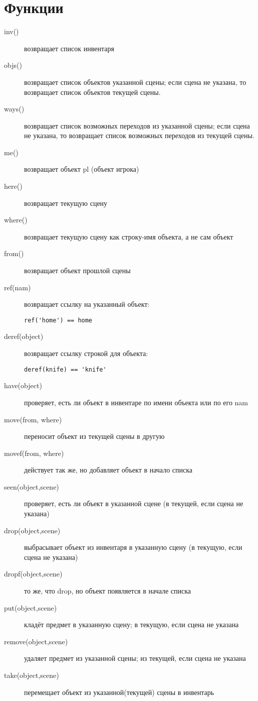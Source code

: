 \documentclass[a4paper,12pt]{article}
\begin{document}
\section{Функции}
\begin{description}
\item[inv()] возвращает список инвентаря
\item[objs()] возвращает список объектов указанной сцены; если сцена не указана, то возвращает список объектов текущей сцены.
\item[ways()] возвращает список возможных переходов из  указанной сцены; если сцена не указана, то возвращает список возможных переходов из  текущей сцены.
\item[me()] возвращает объект pl (объект игрока)
\item[here()] возвращает текущую сцену
\item[where()] возвращает текущую сцену как строку-имя объекта, а не сам объект
\item[from()] возвращает объект прошлой сцены
\item[ref(nam)] возвращает ссылку на указанный объект: \begin{verbatim}ref('home') == home\end{verbatim}
\item[deref(object)] возвращает ссылку строкой для объекта: \begin{verbatim}deref(knife) == 'knife'\end{verbatim}
\item[have(object)] проверяет, есть ли объект в инвентаре по имени объекта или по его nam
\item[move(from, where)] переносит объект из текущей сцены в другую
\item[movef(from, where)] действует так же, но добавляет объект в начало списка
\item[seen(object,scene)] проверяет, есть ли объект в указанной сцене (в текущей, если сцена не указана)
\item[drop(object,scene)] выбрасывает объект из инвентаря в указанную сцену (в текущую, если сцена не указана)
\item[dropf(object,scene)] то же, что drop, но объект появляется в начале списка
\item[put(object,scene)] кладёт предмет в указанную сцену; в текущую, если сцена не указана
\item[remove(object,scene)] удаляет предмет из указанной сцены; из текущей, если сцена не указана
\item[take(object,scene)] перемещает объект из указанной(текущей) сцены в инвентарь

\end{description}
\end{document}
